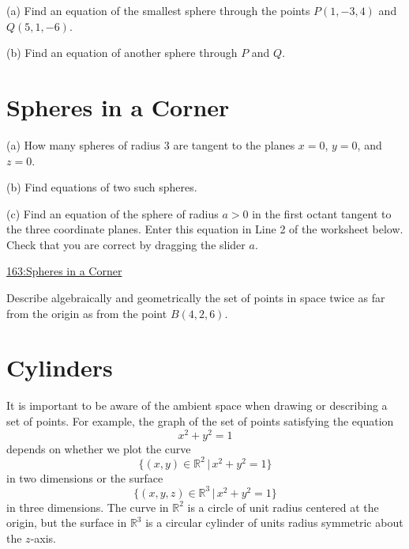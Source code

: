 \documentclass{ximera}
\begin{document}
\begin{example}  \label{Ex:Dfererg556}
(a) Find an equation of the smallest sphere through the points $P(1,-3,4)$ and $Q(5,1,-6)$.

(b) Find an equation of another sphere through $P$ and $Q$.

\end{example}


\section*{Spheres in a Corner}
\begin{question}  \label{Q3442g455t}
(a) How many spheres of radius $3$ are tangent to the planes $x=0$, $y=0$, and $z=0$.

(b) Find equations of two such spheres.

(c) Find an equation of the sphere of radius $a > 0$ in the first octant tangent to the three coordinate planes. Enter this equation in Line 2 of the worksheet below. Check that you are correct by dragging the slider $a$.

\begin{exploration}
\begin{onlineOnly}
    \begin{center}
\end{center}
\end{onlineOnly}

\href{https://www.desmos.com/3d/xbgvh5rrvb}{163:Spheres in a Corner}

\end{exploration}

\end{question}



\begin{example}  \label{Ex:9090dfsadf0}
Describe algebraically and geometrically the set of points in space twice as far from the origin as from the point $B(4,2,6)$.
\end{example}



\section*{Cylinders}

It is important to be aware of the ambient space when drawing or describing a set of points. For example, the graph of the set of points satisfying the equation 
\[
    x^2 + y^2 = 1
\]
depends on whether we plot the curve
\[
   \{  (x,y) \in\mathbb{R}^2 \, | \, x^2 + y^2 = 1 \}
\]
in two dimensions or the surface
\[
   \{  (x,y,z) \in\mathbb{R}^3 \, | \, x^2 + y^2 = 1 \}
\]
in three dimensions. The curve in $\mathbb{R}^2$ is a circle of unit radius centered at the origin, but the surface in $\mathbb{R}^3$ is a circular cylinder of units radius symmetric about the $z$-axis.
\end{document}
